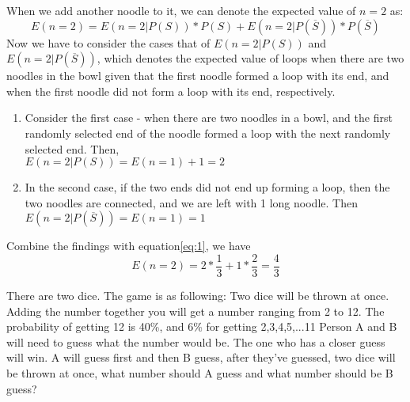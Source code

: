 \documentclass[answers]{exam}
\begin{document}
\begin{questions}
\begin{solution}
    When we add another noodle to it, we can denote the expected value of $n=2$ as:
    \begin{equation}\label{eq:1}
        E(n=2) = E(n=2|P(S))*P(S)+E(n=2|P(\overline{S}))* P(\overline{S})
    \end{equation}
    Now we have to consider the cases that of $E(n=2|P(S))$ and $E(n=2|P(\overline{S}))$,
    which denotes the expected value of loops when there are two noodles in the bowl given that 
    the first noodle formed a loop with its end, and when the first noodle did not form a loop with its end, respectively.
    \begin{enumerate}
        \item Consider the first case - when there are two noodles in a bowl, and the first randomly
        selected end of the noodle formed a loop with the next randomly selected end. Then, \\$E(n=2|P(S)) = E(n=1)+1 = 2$
        \item In the second case, if the two ends did not end up forming a loop, then the two noodles are connected, and we
        are left with 1 long noodle. Then $E(n=2|P(\overline{S})) = E(n=1) = 1$
    \end{enumerate}
    Combine the findings with equation\eqref{eq:1}, we have $$E(n=2) =2*\frac{1}{3}+1*\frac{2}{3} = \frac{4}{3}$$
\end{solution}

\question
There are two dice. The game is as following: 
Two dice will be thrown at once. 
Adding the number together you will get a number ranging from 2 to 12.
The probability of getting 12 is 40\%, and 6\% for getting 2,3,4,5,...11
Person A and B will need to guess what the number would be. 
The one who has a closer guess will win.
A will guess first and then B guess, after they've guessed, 
two dice will be thrown at once, 
what number should A guess and what number should be B guess?
\end{questions}
\end{document}

